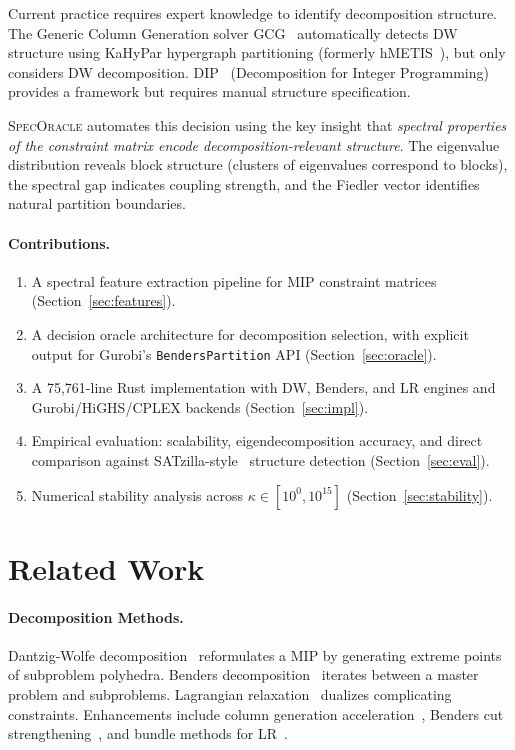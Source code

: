 \documentclass[11pt]{article}
\begin{document}
Current practice requires expert knowledge to identify decomposition structure. The Generic Column Generation solver GCG~\cite{gcg} automatically detects DW structure using KaHyPar hypergraph partitioning (formerly hMETIS~\cite{hmetis}), but only considers DW decomposition. DIP~\cite{dip} (Decomposition for Integer Programming) provides a framework but requires manual structure specification.

\textsc{SpecOracle} automates this decision using the key insight that \emph{spectral properties of the constraint matrix encode decomposition-relevant structure}. The eigenvalue distribution reveals block structure (clusters of eigenvalues correspond to blocks), the spectral gap indicates coupling strength, and the Fiedler vector identifies natural partition boundaries.

\paragraph{Contributions.}
\begin{enumerate}
\item A spectral feature extraction pipeline for MIP constraint matrices (Section~\ref{sec:features}).
\item A decision oracle architecture for decomposition selection, with explicit output for Gurobi's \texttt{BendersPartition} API (Section~\ref{sec:oracle}).
\item A 75,761-line Rust implementation with DW, Benders, and LR engines and Gurobi/HiGHS/CPLEX backends (Section~\ref{sec:impl}).
\item Empirical evaluation: scalability, eigendecomposition accuracy, and direct comparison against SATzilla-style~\cite{xu2008} structure detection (Section~\ref{sec:eval}).
\item Numerical stability analysis across $\kappa \in [10^0, 10^{15}]$ (Section~\ref{sec:stability}).
\end{enumerate}

\section{Related Work}
\label{sec:related}

\paragraph{Decomposition Methods.} Dantzig-Wolfe decomposition~\cite{dw1960} reformulates a MIP by generating extreme points of subproblem polyhedra. Benders decomposition~\cite{benders1962} iterates between a master problem and subproblems. Lagrangian relaxation~\cite{fisher1981} dualizes complicating constraints. Enhancements include column generation acceleration~\cite{lubbecke2005}, Benders cut strengthening~\cite{magnanti1981}, and bundle methods for LR~\cite{lemarechal2001}.
\end{document}
